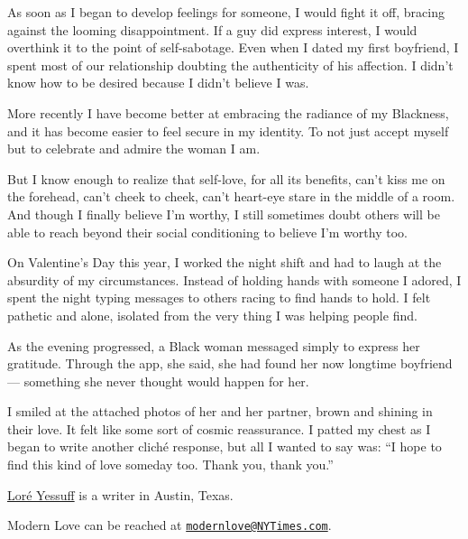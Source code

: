 As soon as I began to develop feelings for someone, I would fight it
off, bracing against the looming disappointment. If a guy did express
interest, I would overthink it to the point of self-sabotage. Even when
I dated my first boyfriend, I spent most of our relationship doubting
the authenticity of his affection. I didn't know how to be desired
because I didn't believe I was.

More recently I have become better at embracing the radiance of my
Blackness, and it has become easier to feel secure in my identity. To
not just accept myself but to celebrate and admire the woman I am.

But I know enough to realize that self-love, for all its benefits, can't
kiss me on the forehead, can't cheek to cheek, can't heart-eye stare in
the middle of a room. And though I finally believe I'm worthy, I still
sometimes doubt others will be able to reach beyond their social
conditioning to believe I'm worthy too.

On Valentine's Day this year, I worked the night shift and had to laugh
at the absurdity of my circumstances. Instead of holding hands with
someone I adored, I spent the night typing messages to others racing to
find hands to hold. I felt pathetic and alone, isolated from the very
thing I was helping people find.

As the evening progressed, a Black woman messaged simply to express her
gratitude. Through the app, she said, she had found her now longtime
boyfriend --- something she never thought would happen for her.

I smiled at the attached photos of her and her partner, brown and
shining in their love. It felt like some sort of cosmic reassurance. I
patted my chest as I began to write another cliché response, but all I
wanted to say was: ``I hope to find this kind of love someday too. Thank
you, thank you.''

\href{https://loreyessuff.com/}{Loré Yessuff} is a writer in Austin,
Texas.

Modern Love can be reached at
\href{mailto:modernlove@NYTimes.com}{\nolinkurl{modernlove@NYTimes.com}}.

